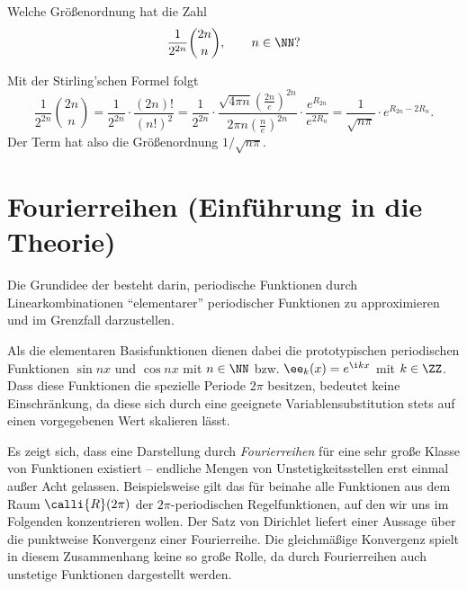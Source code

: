   \begin{frage}
    Welche Größenordnung hat die Zahl 
    \[
    \frac{1}{2^{2n}}\binom{ 2n }{ n }, \qquad n\in \NN
    \text{?}
    \]
  \end{frage}

  \begin{antwort}
    Mit der Stirling'schen Formel folgt 
    \[
    \frac{1}{2^{2n}}\binom{ 2n }{ n } = 
    \frac{1}{2^{2n}} \cdot \frac{ (2n)! }{ (n!)^2 } = 
    \frac{1}{2^{2n}} \cdot 
    \frac{ 
      \sqrt{4\pi n} 
      \left( \frac{2n}{e} \right)^{2n} }{
      2\pi n \left( \frac{n}{e} \right)^{2n} } 
    \cdot \frac{e^{R_{2n}}}{e^{2R_n}} =
    \frac{1}{\sqrt{n\pi}} \cdot e^{R_{2n}-2R_n}.
    \]
    Der Term hat also die Größenordnung $1/\sqrt{n\pi}$. 
    \AntEnd
  \end{antwort} 

  \section{Fourierreihen (Einführung in die Theorie)}

  Die Grundidee der  
  besteht darin, periodische Funktionen 
  durch Linearkombinationen "`elementarer"' periodischer Funktionen 
  zu approximieren und im Grenzfall darzustellen.  

  Als die elementaren Basisfunktionen dienen dabei die prototypischen 
  periodischen Funktionen $\sin nx$ 
  und $\cos nx$ mit $n\in \NN$ bzw. $\ee_k(x)=e^{\i kx}$ mit $k\in\ZZ$. Dass diese Funktionen die 
  spezielle Periode $2\pi$ besitzen, bedeutet keine Einschränkung, 
  da diese sich durch eine geeignete Variablensubstitution stets 
  auf einen vorgegebenen Wert skalieren lässt.

  Es zeigt sich, dass eine Darstellung durch \emph{Fourierreihen} 
  für eine sehr große Klasse von Funktionen existiert -- endliche Mengen von 
  Unstetigkeitsstellen erst einmal außer Acht gelassen. 
  Beispielsweise gilt das für beinahe alle Funktionen aus dem Raum 
  $\calli{R}(2\pi)$ 
  der $2\pi$-periodischen Regelfunktionen, auf den wir uns 
  im Folgenden konzentrieren wollen. Der Satz von Dirichlet liefert einer 
  Aussage über die punktweise Konvergenz einer Fourierreihe. Die gleichmäßige 
  Konvergenz spielt in diesem Zusammenhang keine so große Rolle, da durch 
  Fourierreihen auch unstetige Funktionen dargestellt werden. 

